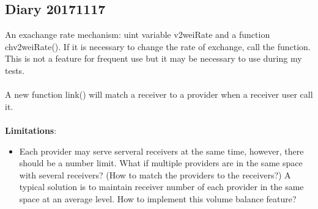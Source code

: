 \subsection{Diary 20171117}
An exachange rate mechanism: uint variable v2weiRate and a function chv2weiRate().
If it is necessary to change the rate of exchange, call the function. This is not 
a feature for frequent use but it may be necessary to use during my tests.\\\\
A new function link() will match a receiver to a provider when a receiver user call it.\\\\
\textbf{Limitations}:
\begin{itemize}
    \item Each provider may serve serveral receivers at the same time, however,
    there should be a number limit. What if multiple providers are in the same space with
    several receivers? (How to match the providers to the receivers?)
    A typical solution is to maintain receiver number of each provider in the same space
    at an average level. How to implement this volume balance feature?
\end{itemize}


%



